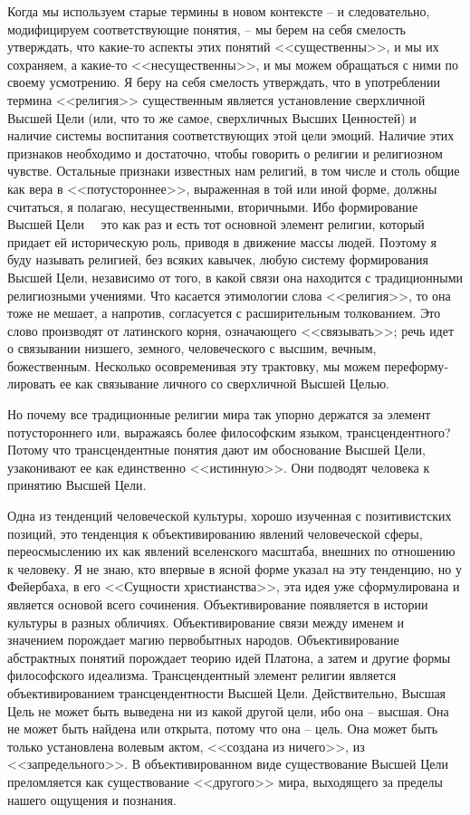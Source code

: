 \documentclass{book}
\begin{document}
Когда мы используем старые термины в новом контексте -- и следовательно, модифицируем соответствующие понятия, -- мы берем на себя смелость утверждать, что какие-то аспекты этих понятий <<существенны>>, и мы их сохраняем, а какие-то <<несущественны>>, и мы можем обращаться с ними по своему усмотрению. Я беру на себя смелость утверждать, что в упот­реблении термина <<религия>> существенным является установ­ление сверхличной Высшей Цели (или, что то же самое, сверх­личных Высших Ценностей) и наличие системы воспитания соответствующих этой цели эмоций. Наличие этих признаков необходимо и достаточно, чтобы говорить о религии и рели­гиозном чувстве. Остальные признаки известных нам религий, в том числе и столь общие как вера в <<потустороннее>>, выра­женная в той или иной форме, должны считаться, я полагаю, несущественными, вторичными. Ибо формирование Высшей Цели   это как раз и есть тот основной элемент религии, кото­рый придает ей историческую роль, приводя в движение массы людей. Поэтому я буду называть 
религией, без 
всяких кавычек, любую систему формирования Высшей Цели, независимо от то­го, в какой связи она находится с традиционными религиоз­ными учениями. Что касается этимологии слова <<религия>>, то она тоже не мешает, а напротив, согласуется с расширитель­ным толкованием. Это слово производят от латинского корня, означающего <<связывать>>; речь идет о связывании низшего, земного, человеческого с высшим, вечным, божественным. Не­сколько осовременивая эту трактовку, мы можем переформу­лировать ее как связывание личного со сверхличной Высшей Целью.

Но почему все традиционные религии мира так упорно держатся за элемент потустороннего или, выражаясь более философским языком, трансцендентного? Потому что трансцендентные понятия дают им обоснование Высшей Цели, узаконивают ее как единственно <<истинную>>. Они подводят человека к принятию Высшей Цели.

Одна из тенденций человеческой культуры, хорошо изучен­ная с позитивистских позиций, это тенденция к объективированию  явлений человеческой сферы, переосмыслению их как яв­лений вселенского масштаба, внешних по отношению к чело­веку. Я не знаю, кто впервые в ясной форме указал на эту тен­денцию, но у Фейербаха, в его <<Сущности христианства>>, эта идея уже сформулирована и является основой всего сочинения. Объективирование появляется в истории культуры в разных обличиях. Объективирование связи между именем и значением порождает магию первобытных народов. Объективирование абстрактных понятий порождает теорию идей Платона, а затем и другие формы философского идеализма. Трансцендентный элемент религии является объективированием трансцендент­ности Высшей Цели. Действительно, Высшая Цель не может быть выведена ни из какой другой цели, ибо она -- высшая. Она не может быть найдена или открыта, потому что она -- цель. Она может быть только установлена волевым актом, <<создана из ничего>>, из <<запредельного>>. В 
объективирован­ном виде существование Высшей Цели преломляется как су­ществование <<другого>> мира, выходящего за пределы нашего ощущения и познания.
\end{document}
